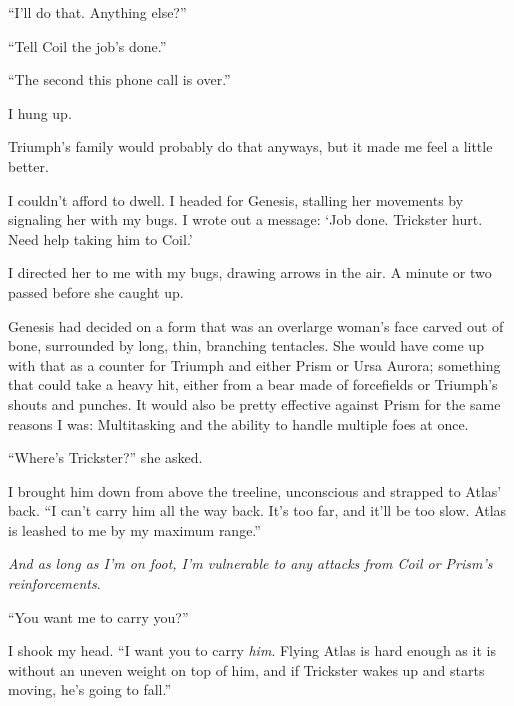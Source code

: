 ``I'll do that.  Anything else?''



``Tell Coil the job's done.''



``The second this phone call is over.''



I hung up.



Triumph's family would probably do that anyways, but it made me feel a little better.



I couldn't afford to dwell.  I headed for Genesis, stalling her movements by signaling her with my bugs.  I wrote out a message: `Job done.  Trickster hurt.  Need help taking him to Coil.'



I directed her to me with my bugs, drawing arrows in the air.  A minute or two passed before she caught up.



Genesis had decided on a form that was an overlarge woman's face carved out of bone, surrounded by long, thin, branching tentacles.  She would have come up with that as a counter for Triumph and either Prism or Ursa Aurora; something that could take a heavy hit, either from a bear made of forcefields or Triumph's shouts and punches.  It would also be pretty effective against Prism for the same reasons I was: Multitasking and the ability to handle multiple foes at once.



``Where's Trickster?'' she asked.



I brought him down from above the treeline, unconscious and strapped to Atlas' back.  ``I can't carry him all the way back.  It's too far, and it'll be too slow.  Atlas is leashed to me by my maximum range.''



\emph{And as long as I'm on foot, I'm vulnerable to any attacks from Coil or Prism's reinforcements}.



``You want me to carry you?''



I shook my head.  ``I want you to carry \emph{him}.  Flying Atlas is hard enough as it is without an uneven weight on top of him, and if Trickster wakes up and starts moving, he's going to fall.''



